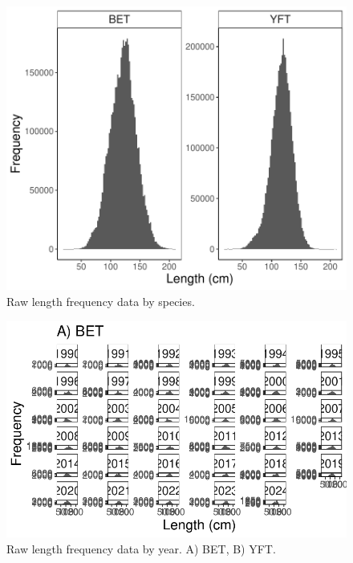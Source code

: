 \documentclass[
  letterpaper,
  DIV=11,
  numbers=noendperiod]{scrartcl}
\begin{document}
\begin{figure}

{\centering \includegraphics{length_data_explore_files/figure-pdf/raw_len_by_spp-1.pdf}

}

\caption{Raw length frequency data by species.}

\end{figure}

\begin{figure}

{\centering \includegraphics{length_data_explore_files/figure-pdf/raw_len_by_yr-1.pdf}

}

\caption{Raw length frequency data by year. A) BET, B) YFT.}

\end{figure}
\end{document}
